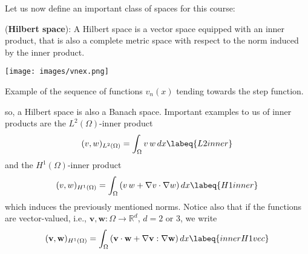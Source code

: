 Let us now define an important class of spaces for this course:
\begin{definition} 
(\textbf{Hilbert space}):
A Hilbert space is a vector space equipped with an inner product, that
is also a complete metric space with respect to the norm induced by
the inner product.
\end{definition}
\begin{marginfigure}[-1.5cm]
	\texttt{[image: images/vnex.png]}
	\caption[]{Example of the sequence of functions $v_n(x)$ tending towards the step function.} 
\end{marginfigure}
so, a Hilbert space is also a Banach space. Important examples to us
of inner products are the $L^2(\Omega)$-inner product
\begin{equation}
(v,w)_{L^2(\Omega)} = \int_{\Omega}{v\,w}\,dx  \labeq{L2inner}
\end{equation}
and the $H^1(\Omega)$-inner product
\begin{equation}
(v,w)_{H^1(\Omega)} = \int_{\Omega}{\left (v\,w + \nabla{v} \cdot \nabla{w}\right )}\,dx \labeq{H1inner}
\end{equation}
which induces the previously mentioned norms. Notice also that if the functions
are vector-valued, i.e., $\mathbf{v},\mathbf{w}: \Omega \rightarrow \mathbb{R}^d$,
$d = 2$ or $3$, we write
\begin{equation}
(\mathbf{v},\mathbf{w})_{H^1(\Omega)} =
\int_{\Omega}{\left (\mathbf{v}\cdot \mathbf{w} + \nabla{\mathbf{v}} : \nabla{\mathbf{w}}\right )}\,dx \labeq{innerH1vec}
\end{equation}

\medskip

